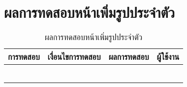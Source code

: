 \section{ผลการทดสอบหน้าเพิ่มรูปประจำตัว}
\begin{table}[H]
	\caption{ผลการทดสอบหน้าเพิ่มรูปประจำตัว}
    \centering	
	\label{tab:test4}
    \begin{tabular}{ | p{4cm} | p{4cm} | p{4cm} | p{2cm} | }
		\hline
	\multicolumn{1}{|c|}{การทดสอบ} & \multicolumn{1}{c|}{เงื่อนไขการทดสอบ} & \multicolumn{1}{c|}{ผลการทดสอบ} & \multicolumn{1}{c|}{ผู้ใช้งาน}                             \\ \hline
	\setstretch{1.0}{ทดสอบหน้าเพิ่มรูปประจำตัว}
	& \setstretch{1.0}{ผู้ใช้เข้ามาในหน้าเพิ่มรูปประจำตัว}
	& \setstretch{1.0}{ระบบแสดงหน้าเพิ่มรูปประจำตัว} 
	&\setstretch{1.0}{\begin{flushleft}ผู้ใช้งาน\end{flushleft}} \\ \cline{2-3} 
	& \setstretch{1.0}{ผู้ใช้กดเปลี่ยนรูปประจำตัว} 
	& \setstretch{1.0}{ระบบแสดงเมนูเปลี่ยนรูปประจำตัว 2 แบบได้แก่ ถ่ายรูป เลือกจากแกลลอรี่} 
	&\setstretch{1.0}{}\\ \cline{2-3} 
	& \setstretch{1.0}{ผู้ใช้เปลี่ยนรูปประจำตัวด้วยการถ่ายรูป}  
	& \setstretch{1.0}{ระบบจะบันทึกรูปที่ได้จากการถ่ายรูปและไปหน้าเพิ่มชื่อเล่น} 
	&\setstretch{1.0}{}\\ \cline{2-3}
	& \setstretch{1.0}{ผู้ใช้เปลี่ยนรูปประจำตัวด้วยการเลือกจากแกลลอรี่}  
	& \setstretch{1.0}{ระบบจะบันทึกรูปที่ได้จากการเลือกจากแกลลอรี่และไปหน้าเพิ่มชื่อเล่น} 
	&\setstretch{1.0}{}\\ \cline{2-3} 
	&\setstretch{1.0}{}\\ \cline{2-3}
	& \setstretch{1.0}{ผู้ใช้ไม่เลือกเปลี่ยนรูปประจำตัว}  
	& \setstretch{1.0}{ระบบบันทึกรูปพื้นฐานของระบบและไปหน้าเพิ่มชื่อเล่น} 
	&\setstretch{1.0}{}\\ \cline{2-3} \hline
    \end{tabular}
\end{table}

